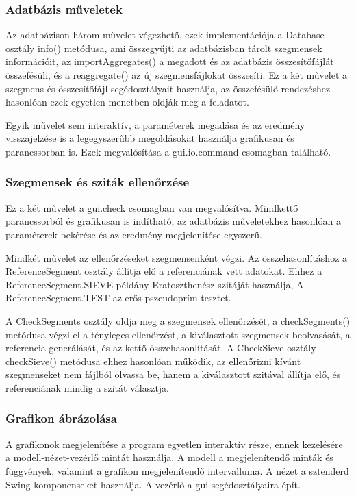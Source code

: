 \subsubsection{Adatbázis műveletek}

Az adatbázison három művelet végezhető, ezek implementációja a Database osztály info() metódusa, ami összegyűjti az adatbázisban tárolt szegmensek információit, az importAggregates() a megadott és az adatbázis összesítőfájlát összefésüli, és a reaggregate() az új szegmensfájlokat összesíti.
Ez a két művelet a szegmens és összesítőfájl segédosztályait használja, az összefésülő rendezéshez hasonlóan ezek egyetlen menetben oldják meg a feladatot.

Egyik művelet sem interaktív, a paraméterek megadása és az eredmény visszajelzése is
a legegyszerűbb megoldásokat használja grafikusan és parancssorban is. Ezek megvalósítása a gui.io.command csomagban található.

\subsubsection{Szegmensek és sziták ellenőrzése}

Ez a két művelet a gui.check csomagban van megvalósítva.
Mindkettő parancssorból és grafikusan is indítható, az adatbázis műveletekhez hasonlóan a paraméterek bekérése és az eredmény megjelenítése egyszerű.

Mindkét művelet az ellenőrzéseket szegmensenként végzi. Az összehasonlításhoz a ReferenceSegment osztály állítja elő a referenciának vett adatokat. Ehhez a ReferenceSegment.SIEVE példány Eratoszthenész szitáját használja, A ReferenceSegment.TEST az erős pszeudoprím tesztet.

A CheckSegments osztály oldja meg a szegmensek ellenőrzését, a checkSegments() metódusa végzi el a tényleges ellenőrzést, a kiválasztott szegmensek beolvasását, a referencia generálását, és az kettő összehasonlítását.
A CheckSieve osztály checkSieve() metódusa ehhez hasonlóan működik, az ellenőrizni kívánt szegmenseket nem fájlból olvassa be, hanem a kiválasztott szitával állítja elő, és referenciának mindig a szitát választja.

\subsubsection{Grafikon ábrázolása}

A grafikonok megjelenítése a program egyetlen interaktív része, ennek kezelésére a modell-nézet-vezérlő mintát használja.
A modell a megjelenítendő minták és függvények, valamint a grafikon megjelenítendő intervalluma.
A nézet a sztenderd Swing komponenseket használja.
A vezérlő a gui segédosztályaira épít.

